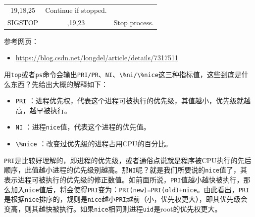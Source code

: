 \documentclass[doctor,openright,twoside]{sjtuthesis}
\providecommand{\tightlist}{%
    \setlength{\itemsep}{0pt}\setlength{\parskip}{0pt}}
\newcommand{\passthrough}[1]{#1}
\theoremstyle{plain}
\theoremstyle{definition}
\theoremstyle{remark}
\theoremstyle{ocrenumbox}
\theoremstyle{plain}
\begin{document}
\begin{longtable}[]{@{}ccl@{}}
\begin{minipage}[t]{0.12\columnwidth}
19,18,25\strut
\end{minipage} & \begin{minipage}[t]{0.70\columnwidth}\raggedright
Continue if stopped.\strut
\end{minipage}\tabularnewline
\begin{minipage}[t]{0.10\columnwidth}\centering
SIGSTOP\strut
\end{minipage} & \begin{minipage}[t]{0.12\columnwidth}\centering
17,19,23\strut
\end{minipage} & \begin{minipage}[t]{0.70\columnwidth}\raggedright
Stop process.\strut
\end{minipage}\tabularnewline
\bottomrule
\end{longtable}

参考网页：

\begin{itemize}
\tightlist
\item
  \url{https://blog.csdn.net/longdel/article/details/7317511}
\end{itemize}

用\passthrough{\lstinline!top!}或者\passthrough{\lstinline!ps!}命令会输出\passthrough{\lstinline!PRI/PR!}、\passthrough{\lstinline!NI!}、\passthrough{\lstinline!\%ni/\%nice!}这三种指标值，这些到底是什么东西？先给出大概的解释如下：

\begin{itemize}
\tightlist
\item
  \passthrough{\lstinline!PRI!}
  ：进程优先权，代表这个进程可被执行的优先级，其值越小，优先级就越高，越早被执行。
\item
  \passthrough{\lstinline!NI!}
  ：进程\passthrough{\lstinline!nice!}值，代表这个进程的优先值。
\item
  \passthrough{\lstinline!\%nice!} ：改变过优先级的进程占用CPU的百分比。
\end{itemize}

\passthrough{\lstinline!PRI!}是比较好理解的，即进程的优先级，或者通俗点说就是程序被CPU执行的先后顺序，此值越小进程的优先级别越高。那\passthrough{\lstinline!NI!}呢？就是我们所要说的\passthrough{\lstinline!nice!}值了，其表示进程可被执行的优先级的修正数值。如前面所说，\passthrough{\lstinline!PRI!}值越小越快被执行，那么加入\passthrough{\lstinline!nice!}值后，将会使得\passthrough{\lstinline!PRI!}变为：\passthrough{\lstinline!PRI(new)=PRI(old)+nice!}。由此看出，\passthrough{\lstinline!PRI!}是根据\passthrough{\lstinline!nice!}排序的，规则是\passthrough{\lstinline!nice!}越小\passthrough{\lstinline!PRI!}越前（小，优先权更大），即其优先级会变高，则其越快被执行。如果\passthrough{\lstinline!nice!}相同则进程\passthrough{\lstinline!uid!}是root的优先权更大。
\end{document}
